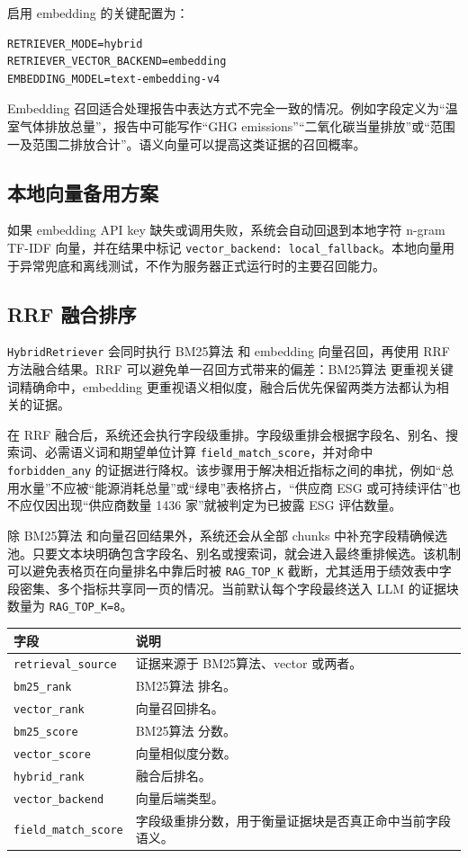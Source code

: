 \documentclass[UTF8,a4paper,12pt]{ctexart}
\newenvironment{manualtable}[1]{%
  \small
  \begin{longtable}{#1}
}{%
  \end{longtable}
  \normalsize
}
\begin{document}
启用 embedding 的关键配置为：

\begin{lstlisting}
RETRIEVER_MODE=hybrid
RETRIEVER_VECTOR_BACKEND=embedding
EMBEDDING_MODEL=text-embedding-v4
\end{lstlisting}

Embedding 召回适合处理报告中表达方式不完全一致的情况。例如字段定义为“温室气体排放总量”，报告中可能写作“GHG emissions”“二氧化碳当量排放”或“范围一及范围二排放合计”。语义向量可以提高这类证据的召回概率。

\subsection{本地向量备用方案}

如果 embedding API key 缺失或调用失败，系统会自动回退到本地字符 n-gram TF-IDF 向量，并在结果中标记 \texttt{vector\_backend: local\_fallback}。本地向量用于异常兜底和离线测试，不作为服务器正式运行时的主要召回能力。

\subsection{RRF 融合排序}

\texttt{HybridRetriever} 会同时执行 BM25算法 和 embedding 向量召回，再使用 RRF 方法融合结果。RRF 可以避免单一召回方式带来的偏差：BM25算法 更重视关键词精确命中，embedding 更重视语义相似度，融合后优先保留两类方法都认为相关的证据。

在 RRF 融合后，系统还会执行字段级重排。字段级重排会根据字段名、别名、搜索词、必需语义词和期望单位计算 \texttt{field\_match\_score}，并对命中 \texttt{forbidden\_any} 的证据进行降权。该步骤用于解决相近指标之间的串扰，例如“总用水量”不应被“能源消耗总量”或“绿电”表格挤占，“供应商 ESG 或可持续评估”也不应仅因出现“供应商数量 1436 家”就被判定为已披露 ESG 评估数量。

除 BM25算法 和向量召回结果外，系统还会从全部 chunks 中补充字段精确候选池。只要文本块明确包含字段名、别名或搜索词，就会进入最终重排候选。该机制可以避免表格页在向量排名中靠后时被 \texttt{RAG\_TOP\_K} 截断，尤其适用于绩效表中字段密集、多个指标共享同一页的情况。当前默认每个字段最终送入 LLM 的证据块数量为 \texttt{RAG\_TOP\_K=8}。

\begin{manualtable}{p{4cm}p{10cm}}
\toprule
\textbf{字段} & \textbf{说明} \\
\midrule
\endhead
\texttt{retrieval\_source} & 证据来源于 BM25算法、vector 或两者。 \\
\texttt{bm25\_rank} & BM25算法 排名。 \\
\texttt{vector\_rank} & 向量召回排名。 \\
\texttt{bm25\_score} & BM25算法 分数。 \\
\texttt{vector\_score} & 向量相似度分数。 \\
\texttt{hybrid\_rank} & 融合后排名。 \\
\texttt{vector\_backend} & 向量后端类型。 \\
\texttt{field\_match\_score} & 字段级重排分数，用于衡量证据块是否真正命中当前字段语义。 \\
\bottomrule
\end{manualtable}
\end{document}
